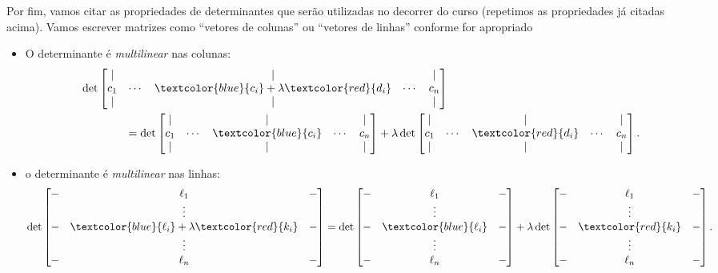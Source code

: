 Por fim, vamos citar as propriedades de determinantes que serão utilizadas no decorrer do curso (repetimos as propriedades já citadas acima). Vamos escrever matrizes como ``vetores de colunas'' ou ``vetores de linhas'' conforme for apropriado

\begin{itemize}
\item O determinante é \textit{multilinear} nas colunas:
	\begin{align*}
	&\det\begin{bmatrix}|&&|&&|\\c_1&\cdots&\textcolor{blue}{c_i}+\lambda \textcolor{red}{d_i}&\cdots&c_n\\|&&|&&|\end{bmatrix}\\
	&\qquad\qquad=\det\begin{bmatrix}|&&|&&|\\c_1&\cdots&\textcolor{blue}{c_i}&\cdots&c_n\\|&&|&&|\end{bmatrix}+\lambda \det\begin{bmatrix}|&&|&&|\\c_1&\cdots&\textcolor{red}{d_i}&\cdots&c_n\\|&&|&&|\end{bmatrix}.
	\end{align*}
	
	\item o determinante é \textit{multilinear} nas linhas:
	\[\det\begin{bmatrix}-&\ell_1&-\\
	&\vdots&\\
	-&\textcolor{blue}{\ell_i}+\lambda \textcolor{red}{k_i}&-\\
	&\vdots&\\
	-&\ell_n&-\end{bmatrix}=\det\begin{bmatrix}-&\ell_1&-\\
	&\vdots&\\
	-&\textcolor{blue}{\ell_i}&-\\
	&\vdots&\\
	-&\ell_n&-\end{bmatrix}+\lambda \det\begin{bmatrix}-&\ell_1&-\\
	&\vdots&\\
	-&\textcolor{red}{k_i}&-\\
	&\vdots&\\
	-&\ell_n&-\end{bmatrix}.\]
	

\end{itemize}

